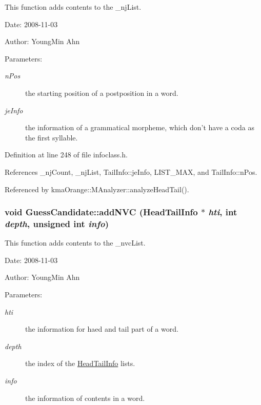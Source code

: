 This function adds contents to the \_\-njList. 

\begin{Desc}
\item[Date:]2008-11-03 \end{Desc}
\begin{Desc}
\item[Author:]YoungMin Ahn \end{Desc}
\begin{Desc}
\item[Parameters:]
\begin{description}
\item[{\em nPos}]the starting position of a postposition in a word. \item[{\em jeInfo}]the information of a grammatical morpheme, which don't have a coda as the first syllable. \end{description}
\end{Desc}


Definition at line 248 of file infoclass.h.

References \_\-njCount, \_\-njList, TailInfo::jeInfo, LIST\_\-MAX, and TailInfo::nPos.

Referenced by kmaOrange::MAnalyzer::analyzeHeadTail().\hypertarget{classGuessCandidate_c013dcabd5da13af7a93a8c037349b25}{
\subsubsection[{addNVC}]{\setlength{\rightskip}{0pt plus 5cm}void GuessCandidate::addNVC ({\bf HeadTailInfo} $\ast$ {\em hti}, \/  int {\em depth}, \/  unsigned int {\em info})}}
\label{classGuessCandidate_c013dcabd5da13af7a93a8c037349b25}


This function adds contents to the \_\-nvcList. 

\begin{Desc}
\item[Date:]2008-11-03 \end{Desc}
\begin{Desc}
\item[Author:]YoungMin Ahn \end{Desc}
\begin{Desc}
\item[Parameters:]
\begin{description}
\item[{\em hti}]the information for haed and tail part of a word. \item[{\em depth}]the index of the \hyperlink{classHeadTailInfo}{HeadTailInfo} lists. \item[{\em info}]the information of contents in a word. \end{description}
\end{Desc}


